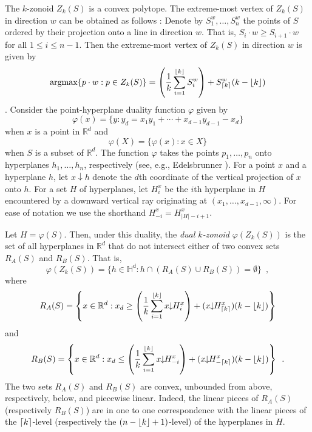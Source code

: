 \documentclass[lotsofwhite]{patmorin}
\newcommand{\argmax}{\mathrm{argmax}}
\newcommand{\drop}{\!\!\downarrow\!\!}
\newcommand{\dual}{\varphi}
\begin{document}
The $k$-zonoid $Z_k(S)$ is a convex polytope.  The extreme-most vertex
of $Z_k(S)$ in direction $w$ can be obtained as follows
\cite{gmXX,beXX}:  Denote by $S_1^w,\ldots,S_n^w$ the points of $S$
ordered by their projection onto a line in direction $w$.  That is,
$S_i\cdot w \ge S_{i+1}\cdot w$ for all $1\le i\le n-1$.  Then the
extreme-most vertex of $Z_k(S)$ in direction $w$ is given by 
\[  
\argmax\{p\cdot w: p\in Z_k(S)\} =
        \left(\frac{1}{k}\sum_{i=1}^{\floor{k}} S_i^w\right) +
          S_{\ceil{k}}^w(k-\floor{k})
\]
\cite{beXX,gmXX}.
Consider the point-hyperplane duality function
$\dual$ given by 
\[
    \dual(x)=\{y : y_d = x_1y_1 +\cdots +x_{d-1}y_{d-1} - x_d \}
\] 
when $x$ is a point in $\mathbb{R}^d$ and
\[
     \dual(X) = \{\dual(x) : x\in X\}
\]
when $S$ is a subset of $\mathbb{R}^d$.  The function $\dual$ takes
the points $p_1,\ldots,p_n$ onto hyperplanes $h_1,\ldots,h_n$,
respectively (see, e.g., Edelsbrunner \cite{eXX}).  For a point $x$
and a hyperplane $h$, let $x\drop h$ denote the $d$th coordinate of
the vertical projection of $x$ onto $h$.  For a set $H$ of
hyperplanes, let $H_i^x$ be the $i$th hyperplane in $H$ encountered by
a downward vertical ray originating at $(x_1,\ldots,x_{d-1},\infty)$.
For ease of notation we use the shorthand $H_{-i}^x=H_{|H|-i+1}^x$.

Let $H=\dual(S)$.  Then,
under this duality, the \emph{dual $k$-zonoid} $\dual(Z_k(S))$ is the set 
of all hyperplanes in $\mathbb{R}^d$
that do not intersect either of two convex sets $R_A(S)$ and $R_B(S)$.
That is,
\[
     \dual(Z_k(S)) = \{ h\in\mathbb{H^d} : h\cap(R_A(S)\cup R_B(S)) = \emptyset \} \enspace ,
\]
where
\begin{equation}
   R_A(S) = \left\{x\in\mathbb{R}^d: x_d \ge 
\left(\frac{1}{k}\sum_{i=1}^{\floor{k}} x\drop H_i^x\right) +
          (x\drop H_{\ceil{k}}^x)(k-\floor{k}) \right\}  \eqlabel{ra}
\end{equation} 
and
\begin{equation}
   R_B(S) = \left\{x\in\mathbb{R}^d: x_d \le 
\left(\frac{1}{k}\sum_{i=1}^{\floor{k}} x\drop H_{-i}^x\right) +
          (x\drop H_{-\ceil{k}}^x)(k-\floor{k}) \right\} \enspace .
\end{equation}
The two sets $R_A(S)$ and $R_B(S)$ are convex, unbounded from above,
respectively, below, and piecewise linear.  Indeed, the linear pieces
of $R_A(S)$ (respectively $R_B(S)$) are in one to one correspondence
with the linear pieces of the $\left\lceil k \right\rceil$-level (respectively
the $(n-\left\lfloor k \right\rfloor+1)$-level) of the hyperplanes in $H$.
\end{document}
